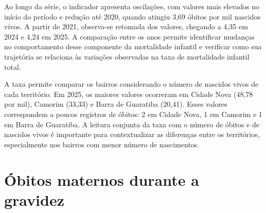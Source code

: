 
Ao longo da série, o indicador apresenta oscilações, com valores mais elevados no início do período e redução até 2020, quando atingiu 3,69 óbitos por mil nascidos vivos. A partir de 2021, observa-se retomada dos valores, chegando a 4,35 em 2024 e 4,24 em 2025. A comparação entre os anos permite identificar mudanças no comportamento desse componente da mortalidade infantil e verificar como sua trajetória se relaciona às variações observadas na taxa de mortalidade infantil total.


A taxa permite comparar os bairros considerando o número de nascidos vivos de cada território. Em 2025, os maiores valores ocorreram em Cidade Nova (48,78 por mil), Camorim (33,33) e Barra de Guaratiba (20,41). Esses valores correspondem a poucos registros de óbitos: 2 em Cidade Nova, 1 em Camorim e 1 em Barra de Guaratiba. A leitura conjunta da taxa com o número de óbitos e de nascidos vivos é importante para contextualizar as diferenças entre os territórios, especialmente nos bairros com menor número de nascimentos.


\section{Óbitos maternos durante a gravidez}


